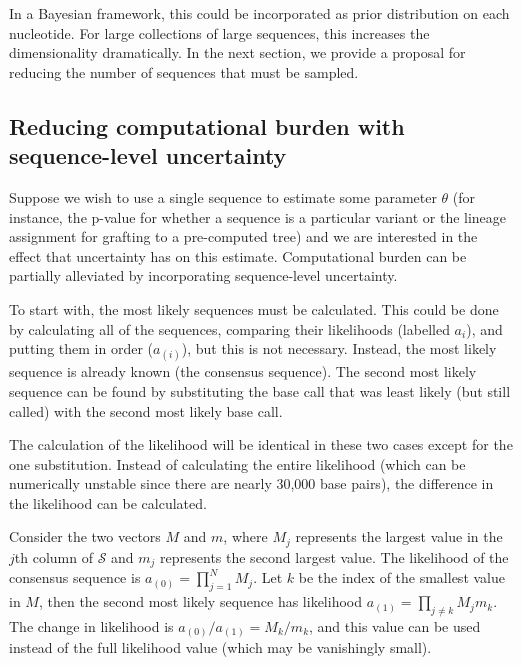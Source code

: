 \documentclass[
]{article}
\newcommand{\nps}{\mathcal{S}} %
\begin{document}
In a Bayesian framework, this could be incorporated as prior
distribution on each nucleotide. For large collections of large
sequences, this increases the dimensionality dramatically. In the next
section, we provide a proposal for reducing the number of sequences that
must be sampled.

\hypertarget{reducing-computational-burden-with-sequence-level-uncertainty}{%
\subsection{Reducing computational burden with sequence-level
uncertainty}\label{reducing-computational-burden-with-sequence-level-uncertainty}}

Suppose we wish to use a single sequence to estimate some parameter
\(\theta\) (for instance, the p-value for whether a sequence is a
particular variant or the lineage assignment for grafting to a
pre-computed tree) and we are interested in the effect that uncertainty
has on this estimate. Computational burden can be partially alleviated
by incorporating sequence-level uncertainty.

To start with, the most likely sequences must be calculated. This could
be done by calculating all of the sequences, comparing their likelihoods
(labelled \(a_i\)), and putting them in order (\(a_{(i)}\)), but this is
not necessary. Instead, the most likely sequence is already known (the
consensus sequence). The second most likely sequence can be found by
substituting the base call that was least likely (but still called) with
the second most likely base call.

The calculation of the likelihood will be identical in these two cases
except for the one substitution. Instead of calculating the entire
likelihood (which can be numerically unstable since there are nearly
30,000 base pairs), the difference in the likelihood can be calculated.

Consider the two vectors \(M\) and \(m\), where \(M_j\) represents the
largest value in the \(j\)th column of \(\nps\) and \(m_j\) represents
the second largest value. The likelihood of the consensus sequence is
\(a_{(0)} = \prod_{j=1}^NM_j\). Let \(k\) be the index of the smallest
value in \(M\), then the second most likely sequence has likelihood
\(a_{(1)} = \prod_{j\ne k}M_jm_k\). The change in likelihood is
\(a_{(0)}/a_{(1)} = M_k/m_k\), and this value can be used instead of the
full likelihood value (which may be vanishingly small).
\end{document}
